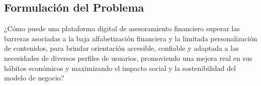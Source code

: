 \subsection*{Formulación del Problema}
¿Cómo puede una plataforma digital de asesoramiento financiero superar las barreras asociadas a la baja alfabetización financiera y la limitada personalización de contenidos, para brindar orientación accesible, confiable y adaptada a las necesidades de diversos perfiles de usuarios, promoviendo una mejora real en sus hábitos económicos y maximizando el impacto social y la sostenibilidad del modelo de negocio?